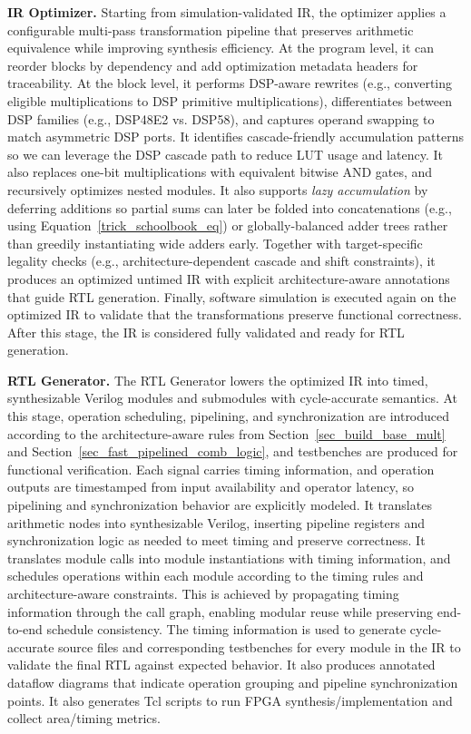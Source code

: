 \documentclass[sigconf,9pt,review]{acmart}
\begin{document}
\noindent\textbf{IR Optimizer.}
Starting from simulation-validated IR, the optimizer applies a configurable multi-pass transformation pipeline that preserves arithmetic equivalence while improving synthesis efficiency.
At the program level, it can reorder blocks by dependency and add optimization metadata headers for traceability.
At the block level, it performs DSP-aware rewrites (e.g., converting eligible multiplications to DSP primitive multiplications), differentiates between DSP families (e.g., DSP48E2 vs. DSP58), and captures operand swapping to match asymmetric DSP ports.
It identifies cascade-friendly accumulation patterns so we can leverage the DSP cascade path to reduce LUT usage and latency.
It also replaces one-bit multiplications with equivalent bitwise AND gates, and recursively optimizes nested modules.
It also supports \emph{lazy accumulation} by deferring additions so partial sums can later be folded into concatenations (e.g., using Equation~\ref{trick_schoolbook_eq}) or globally-balanced adder trees rather than greedily instantiating wide adders early.
Together with target-specific legality checks (e.g., architecture-dependent cascade and shift constraints), it produces an optimized untimed IR with explicit architecture-aware annotations that guide RTL generation.
Finally, software simulation is executed again on the optimized IR to validate that the transformations preserve functional correctness.
After this stage, the IR is considered fully validated and ready for RTL generation.

\noindent\textbf{RTL Generator.}
The RTL Generator lowers the optimized IR into timed, synthesizable Verilog modules and submodules with cycle-accurate semantics.
At this stage, operation scheduling, pipelining, and synchronization are introduced according to the architecture-aware rules from Section~\ref{sec_build_base_mult} and Section~\ref{sec_fast_pipelined_comb_logic}, and testbenches are produced for functional verification.
Each signal carries timing information, and operation outputs are timestamped from input availability and operator latency, so pipelining and synchronization behavior are explicitly modeled.
It translates arithmetic nodes into synthesizable Verilog, inserting pipeline registers and synchronization logic as needed to meet timing and preserve correctness.
It translates module calls into module instantiations with timing information, and schedules operations within each module according to the timing rules and architecture-aware constraints.
This is achieved by propagating timing information through the call graph, enabling modular reuse while preserving end-to-end schedule consistency.
The timing information is used to generate cycle-accurate source files and corresponding testbenches for every module in the IR to validate the final RTL against expected behavior.
It also produces annotated dataflow diagrams that indicate operation grouping and pipeline synchronization points.
It also generates Tcl scripts to run FPGA synthesis/implementation and collect area/timing metrics.
\end{document}
